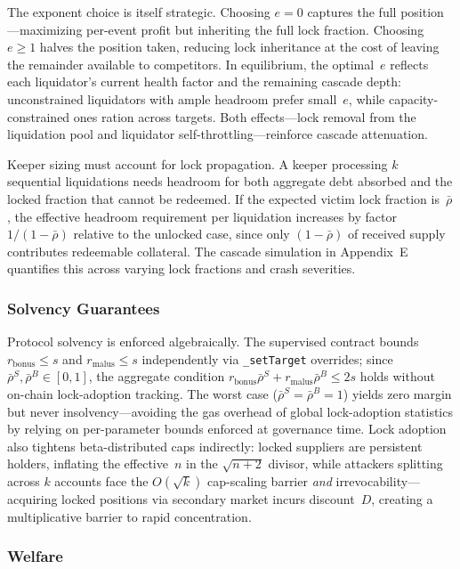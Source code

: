 \documentclass[10pt,a4paper,twocolumn]{article}
\theoremstyle{definition}
\theoremstyle{plain}
\theoremstyle{remark}
\begin{document}
The exponent choice is itself strategic. Choosing $e = 0$ captures the full position---maximizing per-event profit but inheriting the full lock fraction. Choosing $e \geq 1$ halves the position taken, reducing lock inheritance at the cost of leaving the remainder available to competitors. In equilibrium, the optimal~$e$ reflects each liquidator's current health factor and the remaining cascade depth: unconstrained liquidators with ample headroom prefer small~$e$, while capacity-constrained ones ration across targets. Both effects---lock removal from the liquidation pool and liquidator self-throttling---reinforce cascade attenuation.

Keeper sizing must account for lock propagation. A keeper processing $k$ sequential liquidations needs headroom for both aggregate debt absorbed and the locked fraction that cannot be redeemed. If the expected victim lock fraction is~$\bar{\rho}$, the effective headroom requirement per liquidation increases by factor $1/(1{-}\bar{\rho})$ relative to the unlocked case, since only $(1{-}\bar{\rho})$ of received supply contributes redeemable collateral. The cascade simulation in Appendix~E quantifies this across varying lock fractions and crash severities.

\subsubsection{Solvency Guarantees}

Protocol solvency is enforced algebraically. The supervised contract bounds $r_{\text{bonus}} \leq s$ and $r_{\text{malus}} \leq s$ independently via \texttt{\_setTarget} overrides; since $\bar{\rho}^S, \bar{\rho}^B \in [0,1]$, the aggregate condition $r_{\text{bonus}} \bar{\rho}^S + r_{\text{malus}} \bar{\rho}^B \leq 2s$ holds without on-chain lock-adoption tracking. The worst case ($\bar{\rho}^S = \bar{\rho}^B = 1$) yields zero margin but never insolvency---avoiding the gas overhead of global lock-adoption statistics by relying on per-parameter bounds enforced at governance time. Lock adoption also tightens beta-distributed caps indirectly: locked suppliers are persistent holders, inflating the effective~$n$ in the $\sqrt{n{+}2}$ divisor, while attackers splitting across $k$ accounts face the $O(\sqrt{k})$ cap-scaling barrier \emph{and} irrevocability---acquiring locked positions via secondary market incurs discount~$D$, creating a multiplicative barrier to rapid concentration.

\subsubsection{Welfare}
\end{document}

